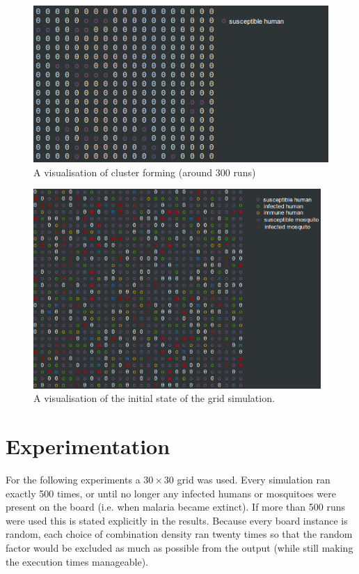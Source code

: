 \documentclass[a4paper]{report}
\begin{document}
\begin{figure}[htbp]
    \centering
    \includegraphics[width=1\textwidth]{population_clusters.png}
    \caption{A visualisation of cluster forming (around 300 runs)}
    \label{fig:clustering}
\end{figure}

\begin{figure}[htbp]
    \centering
    \includegraphics[width=1\textwidth]{malaria_ascii.png}
    \caption{A visualisation of the initial state of the grid simulation. }
    \label{fig:ascii}
\end{figure}

\section{Experimentation} 
For the following experiments a $30 \times 30$ grid was used. Every simulation ran exactly
500 times, or until no longer any infected humans or mosquitoes were present on
the board (i.e. when  malaria became extinct). If more than 500 runs
were used this is stated explicitly in the results.
Because every board instance is random, each choice of combination density ran
twenty times so that the random factor would be excluded as much as possible
from the output (while still making the execution times manageable).
\end{document}

